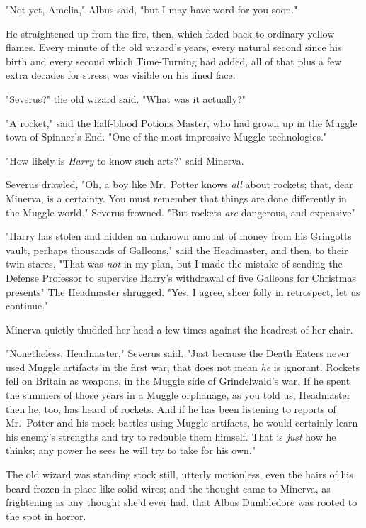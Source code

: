 "Not yet, Amelia," Albus said, "but I may have word for you soon."

He straightened up from the fire, then, which faded back to ordinary yellow
flames. Every minute of the old wizard's years, every natural second since his
birth and every second which Time-Turning had added, all of that plus a few
extra decades for stress, was visible on his lined face.

"Severus?" the old wizard said. "What was it actually?"

"A rocket," said the half-blood Potions Master, who had grown up in the Muggle
town of Spinner's End. "One of the most impressive Muggle technologies."

"How likely is \emph{Harry} to know such arts?" said Minerva.

Severus drawled, "Oh, a boy like Mr.~Potter knows \emph{all} about rockets;
that, dear Minerva, is a certainty. You must remember that things are done
differently in the Muggle world." Severus frowned. "But rockets \emph{are}
dangerous, and expensive{\el}"

"Harry has stolen and hidden an unknown amount of money from his Gringotts
vault, perhaps thousands of Galleons," said the Headmaster, and then, to their
twin stares, "That was \emph{not} in my plan, but I made the mistake of sending
the Defense Professor to supervise Harry's withdrawal of five Galleons for
Christmas presents{\el}" The Headmaster shrugged. "Yes, I agree, sheer folly
in retrospect, let us continue."

Minerva quietly thudded her head a few times against the headrest of her chair.

"Nonetheless, Headmaster," Severus said. "Just because the Death Eaters never
used Muggle artifacts in the first war, that does not mean \emph{he} is
ignorant. Rockets fell on Britain as weapons, in the Muggle side of
Grindelwald's war. If he spent the summers of those years in a Muggle
orphanage, as you told us, Headmaster{\el} then he, too, has heard of
rockets. And if he has been listening to reports of Mr.~Potter and his mock
battles using Muggle artifacts, he would certainly learn his enemy's strengths
and try to redouble them himself. That is \emph{just} how he thinks; any power
he sees he will try to take for his own."

The old wizard was standing stock still, utterly motionless, even the hairs of
his beard frozen in place like solid wires; and the thought came to Minerva, as
frightening as any thought she'd ever had, that Albus Dumbledore was rooted to
the spot in horror.

